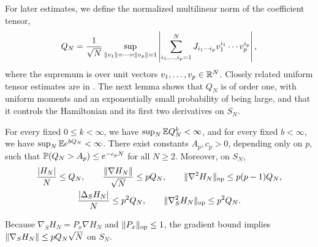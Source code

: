 For later estimates, we define the normalized multilinear norm of the coefficient tensor,
\begin{equation}
Q_N=\frac1{\sqrt N}
\sup_{\lVert v_1\rVert=\cdots=\lVert v_p\rVert=1}
\left|\sum_{i_1,\ldots,i_p=1}^NJ_{i_1\cdots i_p}
               v_1^{i_1}\cdots v_p^{i_p}\right|,
\label{eq:tensor-norm}
\end{equation}
where the supremum is over unit vectors $v_1,\dots,v_p\in\mathbb R^N$. Closely related uniform tensor estimates are in \cite[arXiv version~1, Appendix~B, Lemma~B.1 and Equations~(B.5)--(B.7), pp.~27--29]{bag2006}. The next lemma shows that $Q_N$ is of order one, with uniform moments and an exponentially small probability of being large, and that it controls the Hamiltonian and its first two derivatives on $S_N$.

\begin{lemma}\label{lem:landscape-moments}
For every fixed $0\le k<\infty$, we have $\sup_N\mathbb E Q_N^k<\infty$, and for every fixed $b<\infty$, we have $\sup_N\mathbb E e^{bQ_N}<\infty$. There exist constants $A_p,c_p>0$, depending only on $p$, such that $\mathbb P(Q_N>A_p)\le e^{-c_pN}$ for all $N\ge2$. Moreover, on $S_N$,
\begin{equation}
\begin{gathered}
 \frac{|H_N|}{N}\le Q_N,\qquad
 \frac{\lVert\nabla H_N\rVert}{\sqrt N}\le pQ_N,\qquad
 \lVert\nabla^2H_N\rVert_{\mathrm{op}}\le p(p-1)Q_N,\\
 \frac{|\Delta_SH_N|}{N}\le p^2Q_N,\qquad
 \lVert\nabla^2_SH_N\rVert_{\mathrm{op}}\le p^2Q_N.
\end{gathered}
\label{eq:landscape-derivative-bounds}
\end{equation}
\end{lemma}

Because $\nabla_SH_N=P_x\nabla H_N$ and $\lVert P_x\rVert_{\mathrm{op}}\le1$, the gradient bound implies $\lVert\nabla_SH_N\rVert\le pQ_N\sqrt N$ on $S_N$.

